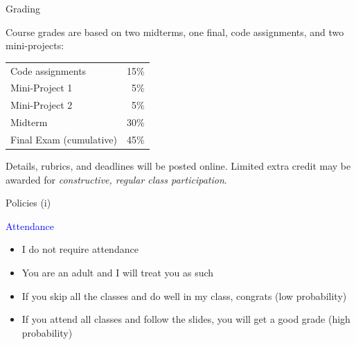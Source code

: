 \documentclass[notes,11pt, aspectratio=169, xcolor=table]{beamer}
\newenvironment{wideitemize}{\itemize\addtolength{\itemsep}{10pt}}{\enditemize}
\begin{document}
\begin{frame}{Grading}
\begin{wideitemize}
    \item Course grades are based on two midterms, one final, code assignments, and two mini-projects:

\medskip
\begin{tabular}{l r}
Code assignments & 15\% \\
Mini-Project 1 & 5\% \\
Mini-Project 2 & 5\% \\
Midterm & 30\% \\
Final Exam (cumulative) & 45\%
\end{tabular}

\medskip
\noindent Details, rubrics, and deadlines will be posted online. Limited extra credit may be awarded for \textit{constructive, regular class participation}.


\end{wideitemize}    
\end{frame}


\begin{frame}{Policies (i)}
\begin{wideitemize}
    \item \textcolor{blue}{Attendance}
    \begin{itemize}
        \item I do not require attendance
        \item You are an adult and I will treat you as such
        \item If you skip all the classes and do well in my class, congrats (low probability)
        \item If you attend all classes and follow the slides, you will get a good grade (high probability) 
    \end{itemize}

\end{wideitemize}    
\end{frame}
\end{document}
